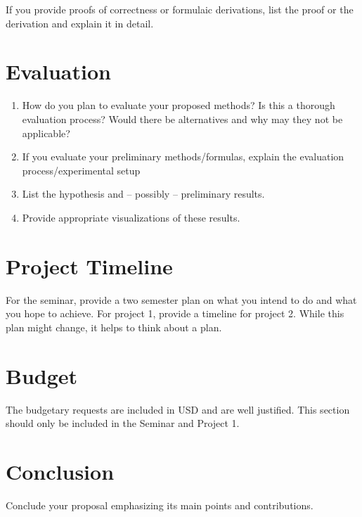 \documentclass{stylefiles/capstone}
\begin{document}
If you provide proofs of correctness or formulaic derivations, list the proof
or the derivation and explain it in detail.

\section{Evaluation}
\begin{enumerate}
    \item How do you plan to evaluate your proposed methods? Is this a
thorough evaluation process? Would there be alternatives and why may they
not be applicable?
\item If you evaluate your preliminary methods/formulas, explain the evaluation
process/experimental setup
\item List the hypothesis and – possibly – preliminary results.
\item Provide appropriate visualizations of these results.
\end{enumerate}

\section{Project Timeline}

For the seminar, provide a two semester plan on what you intend to do and what you hope to achieve. For project 1, provide a timeline for project 2.
While this plan might change, it helps to think about a plan.

\section{Budget}

The budgetary requests are included in USD and are well justified. This section should only be included in the Seminar and Project 1.

\section{Conclusion}
Conclude your proposal emphasizing its main points and contributions.



\end{document}

